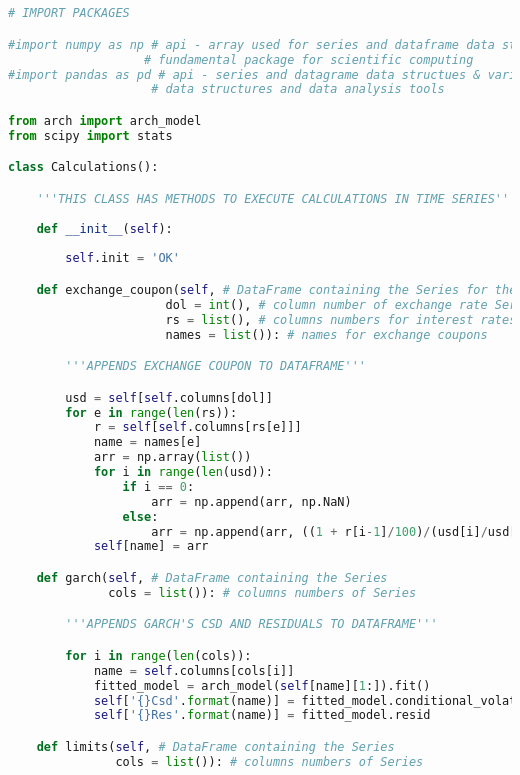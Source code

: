 \begin{lstlisting}[language=Python]


# IMPORT PACKAGES

#import numpy as np # api - array used for series and dataframe data structures
                   # fundamental package for scientific computing
#import pandas as pd # api - series and datagrame data structues & various 
                    # data structures and data analysis tools

from arch import arch_model
from scipy import stats

class Calculations():

    '''THIS CLASS HAS METHODS TO EXECUTE CALCULATIONS IN TIME SERIES'''
    
    def __init__(self):
        
        self.init = 'OK'

    def exchange_coupon(self, # DataFrame containing the Series for the exchange coupon
                      dol = int(), # column number of exchange rate Series
                      rs = list(), # columns numbers for interest rates Series (min 1 number, if > 1 then more than one measure of exchange coupon is generated)
                      names = list()): # names for exchange coupons

        '''APPENDS EXCHANGE COUPON TO DATAFRAME'''

        usd = self[self.columns[dol]]
        for e in range(len(rs)):
            r = self[self.columns[rs[e]]]
            name = names[e]
            arr = np.array(list())
            for i in range(len(usd)):
                if i == 0:
                    arr = np.append(arr, np.NaN)
                else:
                    arr = np.append(arr, ((1 + r[i-1]/100)/(usd[i]/usd[i-1])-1))
            self[name] = arr

    def garch(self, # DataFrame containing the Series 
              cols = list()): # columns numbers of Series

        '''APPENDS GARCH'S CSD AND RESIDUALS TO DATAFRAME'''

        for i in range(len(cols)):
            name = self.columns[cols[i]]
            fitted_model = arch_model(self[name][1:]).fit()
            self['{}Csd'.format(name)] = fitted_model.conditional_volatility
            self['{}Res'.format(name)] = fitted_model.resid

    def limits(self, # DataFrame containing the Series
               cols = list()): # columns numbers of Series


\end{lstlisting}

